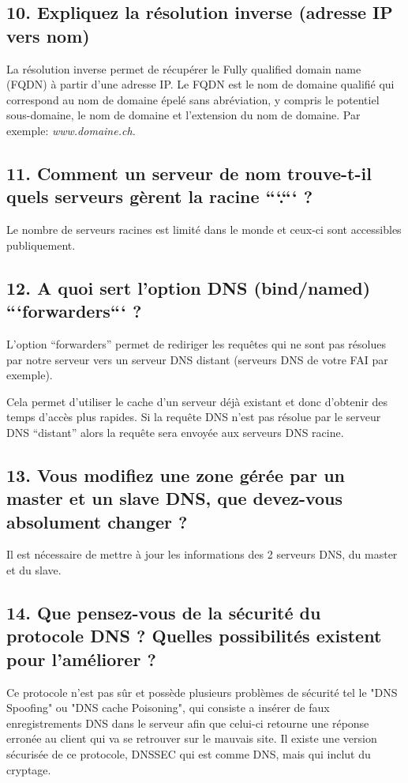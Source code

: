 \documentclass{article}
\begin{document}
\subsection*{10. Expliquez la résolution inverse (adresse IP vers nom)}
La résolution inverse permet de récupérer le Fully qualified domain name (FQDN) à partir d'une adresse IP. Le FQDN est le nom de domaine qualifié qui correspond au nom de domaine épelé sans abréviation, y compris le potentiel sous-domaine, le nom de domaine et l'extension du nom de domaine. Par exemple:
\textit{www.domaine.ch.}

\subsection*{11. Comment un serveur de nom trouve-t-il quels serveurs gèrent la racine ```.``` ?}
Le nombre de serveurs racines est limité dans le monde et ceux-ci sont accessibles publiquement.

\subsection*{12. A quoi sert l’option DNS (bind/named) ```forwarders``` ?}
L'option “forwarders” permet de rediriger les requêtes qui ne sont pas résolues par notre serveur vers un serveur DNS distant (serveurs DNS de votre FAI par exemple).

Cela permet d'utiliser le cache d'un serveur déjà existant et donc d'obtenir des temps d'accès plus rapides. Si la requête DNS n'est pas résolue par le serveur DNS “distant” alors la requête sera envoyée aux serveurs DNS racine.

\subsection*{13. Vous modifiez une zone gérée par un master et un slave DNS, que devez-vous absolument changer ?}
Il est nécessaire de mettre à jour les informations des 2 serveurs DNS, du master et du slave.

\subsection*{14. Que pensez-vous de la sécurité du protocole DNS ? Quelles possibilités existent pour l’améliorer ?}
Ce protocole n'est pas sûr et possède plusieurs problèmes de sécurité tel le "DNS Spoofing" ou "DNS cache Poisoning", qui consiste a insérer de faux enregistrements DNS dans le serveur afin que celui-ci retourne une réponse erronée au client qui va se retrouver sur le mauvais site. Il existe une version sécurisée de ce protocole, DNSSEC qui est comme DNS, mais qui inclut du cryptage.
\end{document}
